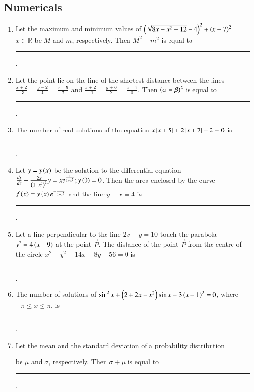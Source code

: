 \documentclass[journal,12pt,onecolumn]{IEEEtran}
\theoremstyle{remark}
\begin{document}
\subsection{Numericals}
\begin{enumerate}

\item Let the maximum and minimum values of $\left(\sqrt{8x-x^2-12}-4\right)^2+\left(x-7\right)^2$, $x\in\mathbb{R}$ be $M$ and $m$, respectively. Then $M^2-m^2$ is equal to \rule{1cm}{0.15mm}.

\hfill{}

\item Let the point  lie on the line of the shortest distance between the lines $\frac{x+2}{-3}=\frac{y-2}{4}=\frac{z-5}{2}$ and $\frac{x+2}{-1}=\frac{y+6}{2}=\frac{z-1}{0}$. Then $\left(\alpha=\beta\right)^2$ is equal to \rule{1cm}{0.15mm}.

\hfill{}

\item The number of real solutions of the equation $x\left\vert x+5\right\vert+2\left\vert x+7\right\vert-2=0$ is \rule{1cm}{0.15mm}.

\hfill{}

\item Let $y=y\left(x\right)$ be the solution to the differential equation $\frac{dy}{dx}+\frac{2x}{\left(1+x^2\right)^2}y=xe^{\frac{1}{1+x^2}};y\left(0\right)=0$. Then the area enclosed by the curve $f\left(x\right)=y\left(x\right)e^{-\frac{1}{1+x^2}}$ and the line $y-x=4$ is \rule{1cm}{0.15mm}.

\hfill{}

\item Let a line perpendicular to the line $2x-y=10$ touch the parabola $y^2=4\left(x-9\right)$ at the point $\vec{P}$. The distance of the point $\vec{P}$ from the centre of the circle $x^2+y^2-14x-8y+56=0$ is \rule{1cm}{0.15mm}.

\hfill{}

\item The number of solutions of $\sin^{2}x+\left(2+2x-x^2\right)\sin x - 3\left(x-1\right)^2=0$, where $-\pi\leq x\leq \pi$, is \rule{1cm}{0.15mm}.

\hfill{}

\item Let the mean and the standard deviation of a probability distribution\\
\begin{center}
   
\end{center}
be $\mu$ and $\sigma$, respectively. Then $\sigma+\mu$ is equal to \rule{1cm}{0.15mm}.


\end{enumerate}
\end{document}
